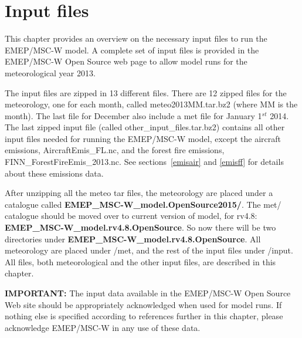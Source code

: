 \chapter{Input files}
\label{ch:InputFiles}

This chapter provides an overview on the necessary input files to run the 
EMEP/MSC-W model. A complete set of input files is provided in the EMEP/MSC-W 
Open Source web page to allow model runs for the meteorological year 2013. 

The input files are zipped in 13 different files. There are 12 zipped files 
for the meteorology, one for each month, called meteo2013MM.tar.bz2 (where MM 
is the month). 
The last file for December also include a met file for January 1$^{st}$ 2014. 
The last zipped input file (called other\_input\_files.tar.bz2) contains all 
other input files needed for running the EMEP/MSC-W model, except the aircraft emissions,
AircraftEmis\_FL.nc, and the forest fire emissions, FINN\_ForestFireEmis\_2013.nc. See sections~\ref{emisair} and \ref{emisff} for details about these emissions data.

After unzipping all the meteo tar files, the meteorology are placed under a
catalogue called {\bf EMEP\-\_MSC-W\_model.OpenSource2015/}. The met/
catalogue should be moved over to current version of model, for rv4.8:
{\bf EMEP\_MSC-W\_model.rv4.8.OpenSource}. 
So now there will be two directories under 
{\bf EMEP\_MSC-W\_model.rv4.8.OpenSource}. 
All meteorology are placed under /met, and the rest of the input files under 
/input. 
All files, both meteorological and the other input files, are described in 
this chapter.

{\bf IMPORTANT:} The input data available in the EMEP/MSC-W Open Source Web
site should be appropriately acknowledged when used for model runs.
If nothing else is specified according to references further in this
chapter, please acknowledge EMEP/MSC-W in any use of these data.

